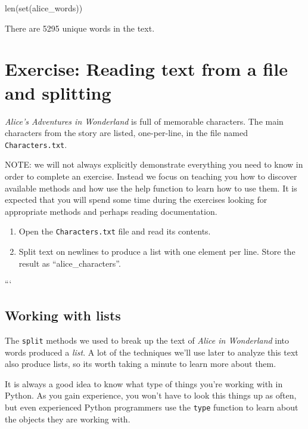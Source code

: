 \documentclass[]{book}
\newenvironment{Shaded}{\begin{snugshade}}{\end{snugshade}}
\newcommand{\BuiltInTok}[1]{#1}
\newcommand{\NormalTok}[1]{#1}
\begin{document}
\begin{Shaded}
\begin{Highlighting}[]
\BuiltInTok{len}\NormalTok{(}\BuiltInTok{set}\NormalTok{(alice_words))}
\end{Highlighting}
\end{Shaded}

There are 5295 unique words in the text.

\section{Exercise: Reading text from a file and
splitting}\label{exercise-reading-text-from-a-file-and-splitting}

\emph{Alice's Adventures in Wonderland} is full of memorable characters.
The main characters from the story are listed, one-per-line, in the file
named \texttt{Characters.txt}.

NOTE: we will not always explicitly demonstrate everything you need to
know in order to complete an exercise. Instead we focus on teaching you
how to discover available methods and how use the help function to learn
how to use them. It is expected that you will spend some time during the
exercises looking for appropriate methods and perhaps reading
documentation.

\begin{enumerate}
\def\labelenumi{\arabic{enumi}.}
\item
  Open the \texttt{Characters.txt} file and read its contents.
\item
  Split text on newlines to produce a list with one element per line.
  Store the result as ``alice\_characters''.
\end{enumerate}

```

\subsection{Working with lists}\label{working-with-lists}

The \texttt{split} methods we used to break up the text of \emph{Alice
in Wonderland} into words produced a \emph{list}. A lot of the
techniques we'll use later to analyze this text also produce lists, so
its worth taking a minute to learn more about them.

It is always a good idea to know what type of things you're working with
in Python. As you gain experience, you won't have to look this things up
as often, but even experienced Python programmers use the \texttt{type}
function to learn about the objects they are working with.
\end{document}
